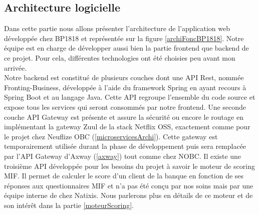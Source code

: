 \subsection{Architecture logicielle}
\label{archiBP1818}

	Dans cette partie nous allons présenter l'architecture de l'application web développée chez BP1818 et représentée sur la figure \ref{archiFoncBP1818}. Notre équipe est en charge de développer aussi bien la partie frontend que backend de ce projet. Pour cela, différentes technologies ont été choisies peu avant mon arrivée. \\
	
	Notre backend est constitué de plusieurs couches dont une API Rest, nommée Fronting-Business, développée à l'aide du framework Spring en ayant recours à Spring Boot et au langage Java. Cette API regroupe l'ensemble du code source et expose tous les services qui seront consommés par notre frontend. Une seconde couche API Gateway est présente et assure la sécurité ou encore le routage en implémentant la gateway Zuul de la stack Netflix OSS, exactement comme pour le projet chez Neuflize OBC (\ref{microservicesArchi}). Cette gateway est temporairement utilisée durant la phase de développement puis sera remplacée par l'API Gateway d'Axway (\ref{axway}) tout comme chez NOBC. Il existe une troisième API développée pour les besoins du projet à savoir le moteur de scoring MIF. Il permet de calculer le score d'un client de la banque en fonction de ses réponses aux questionnaires MIF et n'a pas été conçu par nos soins mais par une équipe interne de chez Natixis. Nous parlerons plus en détails de ce moteur et de son intérêt dans la partie \ref{moteurScoring}. \\
	
